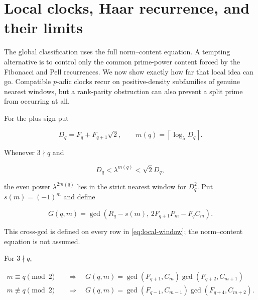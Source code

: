 %
%
\section{Local clocks, Haar recurrence, and their limits}
\label{sec:local-clocks}

The global classification uses the full norm--content equation. A tempting
alternative is to control only the common prime-power content forced by the
Fibonacci and Pell recurrences. We now show exactly how far that local idea
can go. Compatible $p$-adic clocks recur on positive-density subfamilies of
genuine nearest windows, but a rank-parity obstruction can also prevent a
split prime from occurring at all.

For the plus sign put

\begin{equation}
 D_q=F_q+F_{q+1}\sqrt2,
 \qquad
 m(q)=\left\lceil\log_\lambda D_q\right\rceil.
 \label{eq:local-m}
\end{equation}

Whenever $3\nmid q$ and

\begin{equation}
 D_q<\lambda^{m(q)}<\sqrt2D_q,
 \label{eq:local-window}
\end{equation}

the even power $\lambda^{2m(q)}$ lies in the strict nearest window for
$D_q^2$. Put $s(m)=(-1)^{m}$ and define

\begin{equation}
 G(q,m)=\gcd\left(
 R_q-s(m),\,
 2F_{q+1}P_m-F_qC_m
 \right).
 \label{eq:cross-gcd}
\end{equation}

This cross-gcd is defined on every row in \cref{eq:local-window}; the
norm--content equation is not assumed.

\begin{lemma}
\label{lem:cross-gcd-factorizations}
For $3\nmid q$,

\begin{equation}
\begin{aligned}
 m\equiv q\pmod2\quad&\Longrightarrow\quad
 G(q,m)=
 \gcd(F_{q+1},C_m)\gcd(F_{q+2},C_{m+1})\\[2mm]
 m\not\equiv q\pmod2\quad&\Longrightarrow\quad
 G(q,m)=
 \gcd(F_{q-1},C_{m-1})\gcd(F_{q+4},C_{m+2}).
\end{aligned}
\label{eq:cross-gcd-factorizations}
\end{equation}
\end{lemma}

